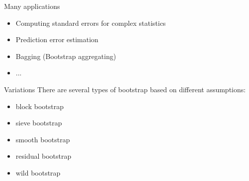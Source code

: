 \documentclass[14pt]{beamer}
\begin{document}
\begin{frame}[plain]{Many applications}

\begin{itemize}
	\item Computing standard errors for complex statistics
	\item Prediction error estimation
	\item Bagging (Bootstrap aggregating)
	\item ...
\end{itemize}	
\pause

\begin{block}{Variations}
There are several types of bootstrap based on different assumptions:
\begin{itemize}\itemsep=0cm\parskip=0cm
\item block bootstrap
\item sieve bootstrap
\item smooth bootstrap
\item residual bootstrap
\item wild bootstrap
\end{itemize}
\end{block}
\end{frame}
\end{document}
